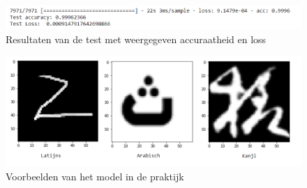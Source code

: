 \begin{figure}
    
    
    \includegraphics[width=\linewidth]{img/testResults.png}
    
    \caption{Resultaten van de test met weergegeven accuraatheid en loss}
    \label{tab:testResults}
    
\end{figure}



 
\begin{figure}
    
    
    \includegraphics[width=\linewidth]{img/voorbeelden.png}
    \caption{Voorbeelden van het model in de praktijk}
    \label{tab:examples}

\end{figure}









 














